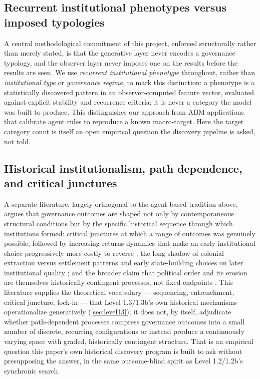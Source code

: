 \subsection{Recurrent institutional phenotypes versus imposed typologies}
\label{sec:recurrent-vs-imposed}

A central methodological commitment of this project, enforced structurally
rather than merely stated, is that the generative layer never encodes a
governance typology, and the observer layer never imposes one on the
results before the results are seen. We use \textit{recurrent
institutional phenotype} throughout, rather than \textit{institutional
type} or \textit{governance regime}, to mark this distinction: a phenotype
is a statistically discovered pattern in an observer-computed feature
vector, evaluated against explicit stability and recurrence criteria; it is
never a category the model was built to produce. This distinguishes our
approach from ABM applications that calibrate agent rules to reproduce a
known macro-target. Here the target category count is itself an open
empirical question the discovery pipeline is asked, not told.

\subsection{Historical institutionalism, path dependence, and critical junctures}
\label{sec:historical-institutionalism}

A separate literature, largely orthogonal to the agent-based tradition
above, argues that governance outcomes are shaped not only by
contemporaneous structural conditions but by the specific historical
sequence through which institutions formed: critical junctures at which
a range of outcomes was genuinely possible, followed by increasing-returns
dynamics that make an early institutional choice progressively more costly
to reverse \parencite{pierson2000increasing,mahoney2000path,capoccia2007critical};
the long shadow of colonial extraction versus
settlement patterns and early state-building choices on later institutional
quality \parencite{acemoglu2012why,northwallisweingast2009}; and the
broader claim that political order and its erosion are themselves
historically contingent processes, not fixed endpoints
\parencite{fukuyama2014political,north1990institutions}. This literature
supplies the theoretical vocabulary --- sequencing, entrenchment, critical
juncture, lock-in --- that Level 1.3/1.3b's own historical mechanisms
operationalize generatively (\cref{sec:level13}); it does not, by itself,
adjudicate whether path-dependent processes compress governance outcomes
into a small number of discrete, recurring configurations or instead
produce a continuously varying space with graded, historically contingent
structure. That is an empirical question this paper's own historical
discovery program is built to ask without presupposing the answer, in the
same outcome-blind spirit as Level 1.2/1.2b's synchronic search.

